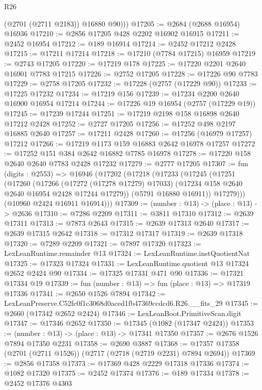 \begin{lexlean}{R26}
\begin{coremodule}
          (@2701 (@2711 @2183))
          @16880
          @90)))
@17205 := @2684 (@2688 @16954) @16936
@17210 := @2856 @17205 @428 @2202 @16902 @16915
@17211 := @2452 @16954
@17212 := @189 @16914
@17214 := @2452 @17212 @2428
@17215 := @17211 @17214
@17218 := @17210 (@7784 @17215) @16959
@17219 := @2743 @17205
@17220 := @17219 @178
@17225 := @17220 @2201 @2640 @16901 @7783 @17215
@17226 := @2752 @17205
@17228 := @17226 @90 @7783
@17229 := @2758 @17205
@17232 := @17228 (@2757 (@17229 @90))
@17233 := @17225 @17232
@17234 := @17219 @156
@17239 := @17234 @2200 @2640 @16900 @16954 @17214
@17244 := @17226 @19 @16954 (@2757 (@17229 @19))
@17245 := @17239 @17244
@17251 := @17219 @2198 @158 @16898 @2640 @17212 @2428
@17252 := @2727 @17205
@17256 := @17252 @498 @2197 @16885 @2640
@17257 := @17211 @2428
@17260 := @17256 (@16979 @17257) @17212
@17266 := @17219 @1173 @159 @16883 @2642 @16978 @17257
@17272 := @17252 @151 @384 @2642 @16882 @7785 @16978
@17278 := @17220 @158 @2640 @2640 @7783 @2428 @17232
@17279 := @2777 @17205
@17307 := fun (digits : @2553) =>
  @16946
    (@17202
      (@17218
        (@17233
          (@17245
            (@17251
              (@17260
                (@17266
                  (@17272 (@17278 @17279) @17033)
                  (@17234 @158 @2640 @2640 @16954 @2428 @17244 @17279))
                (@5791 @16880 @16911))
              @17279)))
        (@10960 @2424 @16911 @16914)))
@17309 := (number : @13) -> (place : @13) -> @2636
@17310 := @7286 @2209
@17311 := @3811 @17310
@17312 := @2639 @17311
@17313 := @7873 @2643
@17315 := @2639 @17313 @2640
@17317 := @2639 @17315 @2642
@17318 := @17312 @17317
@17319 := @2639 @17318
@17320 := @7289 @2209
@17321 := @7897 @17320
@17323 := LexLeanRuntime.remainder @13
@17324 := LexLeanRuntime.instQuotientNat
@17325 := @17323 @17324
@17331 := LexLeanRuntime.quotient @13 @17324 @2652 @2424 @90
@17334 := @17325 @17331 @471 @90
@17336 := @17321 @17334 @19
@17339 := fun (number : @13) => fun (place : @13) => @17319 @17336
@17341 := @2650 @1526 @7894
@17342 := LexLeanPreserve.C52fc0f1c3068d0aced1fb47369ccdcd6.R26.__fits_29
@17345 := @2660 (@17342 @2652 @2424)
@17346 := LexLeanBoot.PrimitiveScan.digit
@17347 := @17346 @2652
@17350 := @17345 (@1082 (@17347 @2424))
@17353 := (number : @13) -> (place : @13) -> @17341 @17350
@17357 := @2676 @1526 @7894 @17350 @2231
@17358 := @2690 @3887
@17368 := @17357 @17358 (@2701 (@2711 @1526)) (@2717 (@2718 (@2719 @2231) @7894 @2694))
@17369 := @2856 @17358
@17373 := @17369 @428 @2229 @17318 @17336
@17374 := @1082 @17320
@17375 := @2452 @17374
@17376 := @189 @17334
@17378 := @2452 @17376 @4303

\end{coremodule}
\end{lexlean}
